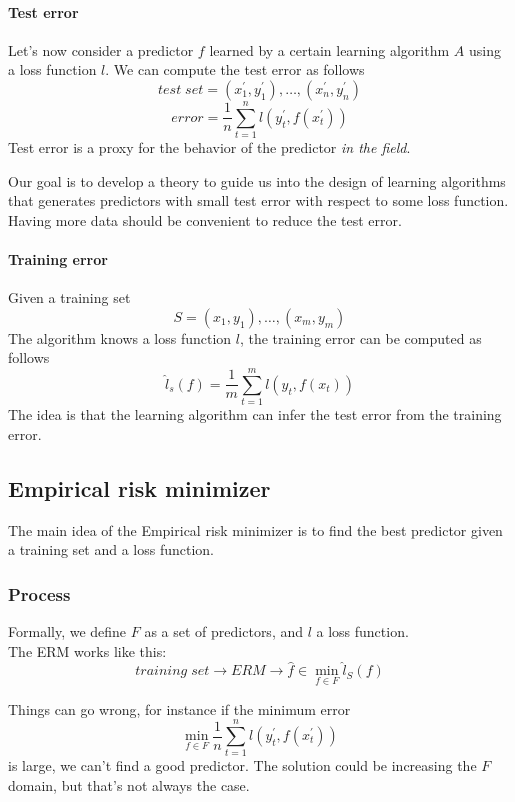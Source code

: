 \paragraph{Test error}
Let's now consider a predictor $f$ learned by a certain learning algorithm $A$ 
using a loss function $l$.
We can compute the test error as follows
$$\mathit{test\;set} = (x^\prime_1, y^\prime_1), \dots,(x^\prime_n, y^\prime_n)$$
$$\mathit{error} = \frac{1}{n}\sum_{t=1}^n l(y^\prime_t, f(x^\prime_t))$$
Test error is a proxy for the behavior of the predictor \emph{in the field}.

\begin{remark}
    Our goal is to develop a theory to guide us into the design of learning algorithms 
    that generates predictors with small test error with respect to some loss function.\\
    Having more data should be convenient to reduce the test error.
\end{remark}

\paragraph{Training error}
Given a training set
$$S = (x_1, y_1), \dots,(x_m, y_m)$$
The algorithm knows a loss function $l$, the training error can be computed as follows
$$\hat{l}_s(f) = \frac{1}{m}\sum_{t=1}^m l(y_t, f(x_t))$$
The idea is that the learning algorithm can infer the test error from the training error.

\subsection{Empirical risk minimizer}
The main idea of the Empirical risk minimizer is to find the best predictor given 
a training set and a loss function.

\subsubsection{Process}
Formally, we define $F$ as a set of predictors, and $l$ a loss function.\\
The ERM works like this:
$$\mathit{training\;set} \longrightarrow \mathit{ERM} \longrightarrow 
\hat{f} \in \min_{f \in F} \hat{l}_S(f)$$

Things can go wrong, for instance if the minimum error
$$\min_{f \in F} \frac{1}{n}\sum_{t = 1}^n l(y_t^\prime, f(x_t^\prime))$$
is large, we can't find a good predictor. The solution could be increasing the $F$ domain, 
but that's not always the case.

